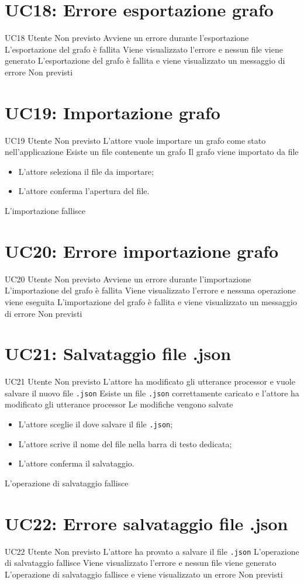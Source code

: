 \documentclass[../AnalisideiRequisiti.tex]{subfiles}
\begin{document}
	\section{UC18: Errore esportazione grafo}
	\UserCase
	{UC18}
	{Utente}
	{Non previsto}
	{Avviene un errore durante l'esportazione}
	{L'esportazione del grafo è fallita}
	{Viene visualizzato l'errore e nessun file viene generato}
	{L'esportazione del grafo è fallita e viene visualizzato un messaggio di errore}
	{Non previsti}
	
	\section{UC19: Importazione grafo}
	\UserCase
	{UC19}
	{Utente}
	{Non previsto}
	{L'attore vuole importare un grafo come stato nell'applicazione}
	{Esiste un file contenente un grafo}
	{Il grafo viene importato da file}
	{
		\begin{itemize}
			\item{} L'attore seleziona il file da importare;
			\item{} L'attore conferma l'apertura del file.
		\end{itemize}
	}
	{L'importazione fallisce }
	
	\section{UC20: Errore importazione grafo}
	\UserCase
	{UC20}
	{Utente}
	{Non previsto}
	{Avviene un errore durante l'importazione}
	{L'importazione del grafo è fallita}
	{Viene visualizzato l'errore e nessuna operazione viene eseguita}
	{L'importazione del grafo è fallita e viene visualizzato un messaggio di errore}
	{Non previsti}
	
	\section{UC21: Salvataggio file .json}
	\UserCase
	{UC21}
	{Utente}
	{Non previsto}
	{L'attore ha modificato gli utterance processor e vuole salvare il nuovo file \verb|.json|}
	{Esiste un file \verb|.json| correttamente caricato  e l'attore ha modificato gli utterance processor }
	{Le modifiche vengono salvate}
	{
		\begin{itemize}
			\item{} L'attore sceglie il dove salvare il file \verb|.json|;
			\item{} L'attore scrive il nome del file nella barra di testo dedicata;
			\item{} L'attore conferma il salvataggio.
		\end{itemize}
	}
	{L'operazione di salvataggio fallisce }
	
	\section{UC22: Errore salvataggio file .json}
	\UserCase
	{UC22}
	{Utente}
	{Non previsto}
	{L'attore ha provato a salvare il file \verb|.json|}
	{L'operazione di salvataggio fallisce}
	{Viene visualizzato l'errore e nessun file viene generato}
	{L'operazione di salvataggio fallisce e viene visualizzato un errore}
	{Non previsti}
	
\end{document}
